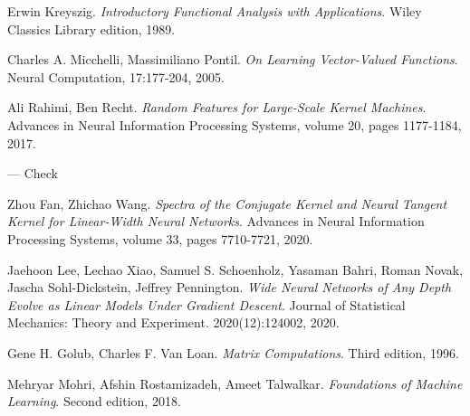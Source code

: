 \documentclass[11pt, a4paper]{article}
\begin{document}
\begin{thebibliography}{999}
 Erwin Kreyszig. \textit{Introductory Functional Analysis with Applications}. Wiley Classics Library edition, 1989.

 Charles A. Micchelli, Massimiliano Pontil. \textit{On Learning Vector-Valued Functions}. Neural Computation, 17:177-204, 2005.

 Ali Rahimi, Ben Recht. \textit{Random Features for Large-Scale Kernel Machines}. Advances in Neural Information Processing Systems, volume 20, pages 1177-1184, 2017.
 
--- Check

 Zhou Fan, Zhichao Wang. \textit{Spectra of the Conjugate Kernel and Neural Tangent Kernel for Linear-Width Neural Networks}. Advances in Neural Information Processing Systems, volume 33, pages 7710-7721, 2020.

 Jaehoon Lee, Lechao Xiao, Samuel S. Schoenholz, Yasaman Bahri, Roman Novak, Jascha Sohl-Dickstein, Jeffrey Pennington. \textit{Wide Neural Networks of Any Depth Evolve as Linear Models Under Gradient Descent}. Journal of Statistical Mechanics: Theory and Experiment. 2020(12):124002, 2020.

 Gene H. Golub, Charles F. Van Loan. \textit{Matrix Computations}. Third edition, 1996.

 Mehryar Mohri, Afshin Rostamizadeh, Ameet Talwalkar. \textit{Foundations of Machine Learning}. Second edition, 2018.

\end{thebibliography}
\end{document}

